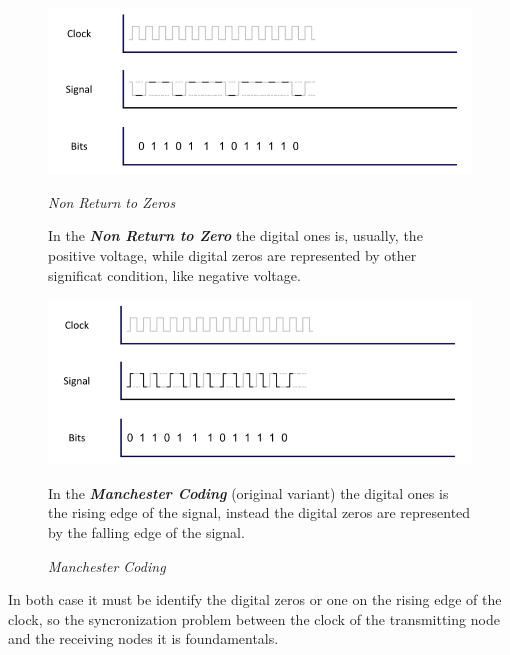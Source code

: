 \begin{figure}[h]
    \centering
    \begin{minipage}[t]{0.45\textwidth}
        \centering
        \includegraphics[width=\textwidth]{img/nrz_coding}
        \caption{\textit{Non Return to Zeros}}
        
        \begin{flushleft}
            In the \textbf{\textit{Non Return to Zero}} the digital ones is, usually, the positive voltage, while digital zeros are represented by other significat condition, like negative voltage.
        \end{flushleft}

    \end{minipage}
    \begin{minipage}[t]{0.45\textwidth}
        \centering
        \includegraphics[width=\textwidth]{img/m_coding}
        \caption{\textit{Manchester Coding}}
        
        \begin{flushleft}
            In the \textbf{\textit{Manchester Coding}} (original variant) the digital ones is the rising edge of the signal, instead the digital zeros are represented by the falling edge of the signal.
        \end{flushleft}
        
    \end{minipage}
\end{figure}

In both case it must be identify the digital zeros or one on the rising edge of the clock, so the syncronization problem between the clock of the transmitting node and the receiving nodes it is foundamentals.